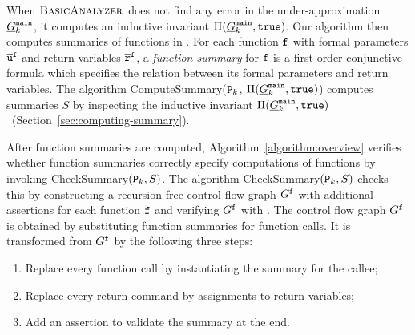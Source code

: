 When $\textup{\textsc{BasicAnalyzer}}$ does not find any error in the
under-approximation $\underline{G}^{\mathtt{{main}}}_k$, it computes an inductive
invariant $\Pi (\underline{G}^{\mathtt{{main}}}_k, \mathtt{true})$. Our algorithm then computes
summaries of functions in . For each function $\mathtt{{f}}$ with
formal parameters $\overline{\mathtt{u}}^{\mathtt{{f}}}$ and return
variables $\overline{\mathtt{r}}^{\mathtt{{f}}}$, a \emph{function summary} for
$\mathtt{{f}}$ is a 
first-order conjunctive formula which specifies the relation between
its formal parameters and return variables. The algorithm
ComputeSummary($\textup{\texttt{{P}}}_k$, $\Pi (\underline{G}^{\mathtt{{main}}}_k, \mathtt{true})$) computes summaries $S$ by inspecting
the inductive invariant $\Pi (\underline{G}^{\mathtt{{main}}}_k, \mathtt{true})$~(Section~\ref{sec:computing-summary}).

After function summaries are computed, Algorithm~\ref{algorithm:overview} 
verifies whether function summaries correctly specify computations of
functions by invoking CheckSummary$(\textup{\texttt{{P}}}_k, S)$.
The algorithm CheckSummary$(\textup{\texttt{{P}}}_k, S)$ checks this by constructing a recursion-free control flow
graph $\tilde{G}^{\mathtt{{f}}}$ with additional assertions for each
function $\mathtt{{f}}$ and verifying $\tilde{G}^{\mathtt{{f}}}$ with
. The control flow graph
$\tilde{G}^{\mathtt{{f}}}$ is obtained by substituting function
summaries for function calls.
It is transformed from $G^{\mathtt{{f}}}$ by the
following three steps:
\begin{enumerate}
\item Replace every function call by instantiating the summary for the
  callee;
\item Replace every return command by assignments to return variables;
\item Add an assertion to validate the summary at the end.
\end{enumerate}
